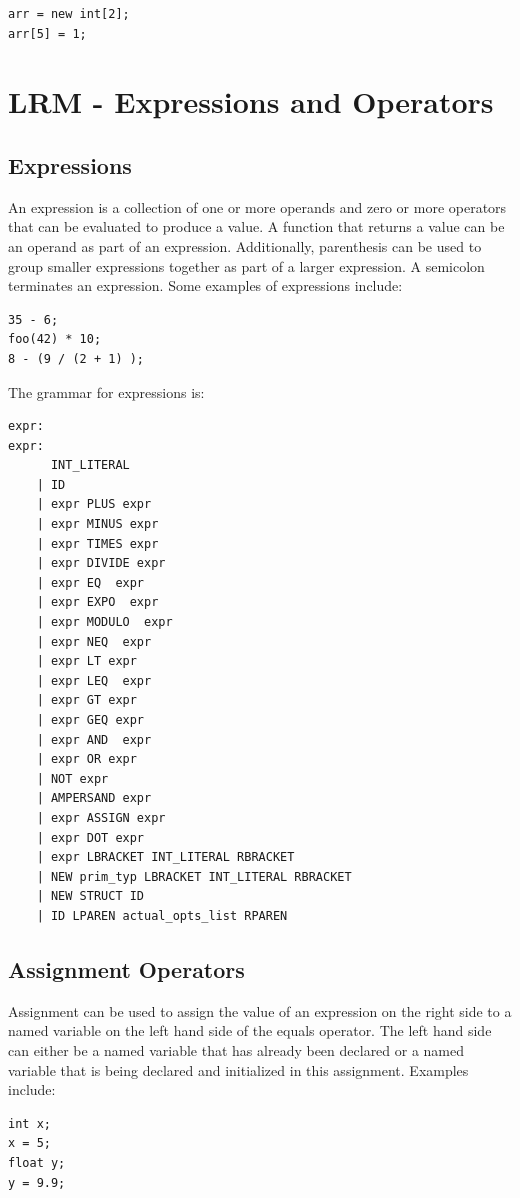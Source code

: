\documentclass{article}
\begin{document}
 \begin{lstlisting}
arr = new int[2];
arr[5] = 1;
\end{lstlisting}

\section{LRM - Expressions and Operators}

\subsection{Expressions}
An expression is a collection of one or more operands and zero or more operators that can be evaluated to produce a value.  A function that returns a value can be an operand as part of an expression.  Additionally, parenthesis can be used to group smaller expressions together as part of a larger expression.  A semicolon terminates an expression.  Some examples of expressions include:
\begin{lstlisting}
35 - 6;
foo(42) * 10;
8 - (9 / (2 + 1) );
\end{lstlisting}

The grammar for expressions is: 
\begin{Verbatim}[frame=single]
expr:
expr:
	  INT_LITERAL 	
	| ID 		
	| expr PLUS expr
	| expr MINUS expr
	| expr TIMES expr 
	| expr DIVIDE expr 	
	| expr EQ  expr 
	| expr EXPO  expr 
	| expr MODULO  expr 	
	| expr NEQ  expr 	
	| expr LT expr 		
	| expr LEQ  expr 
	| expr GT expr 		
	| expr GEQ expr 	
	| expr AND  expr 	
	| expr OR expr 		
	| NOT expr		
	| AMPERSAND expr	
	| expr ASSIGN expr
	| expr DOT expr 	
	| expr LBRACKET INT_LITERAL RBRACKET 	   
	| NEW prim_typ LBRACKET INT_LITERAL RBRACKET
	| NEW STRUCT ID 			
	| ID LPAREN actual_opts_list RPAREN          
\end{Verbatim}



\subsection{Assignment Operators}
Assignment can be used to assign the value of an expression on the right side to a named variable on the left hand side of the equals operator.  The left hand side can either be a named variable that has already been declared or a named variable that is being declared and initialized in this assignment.  Examples include:
\begin{lstlisting}
int x;
x = 5;
float y;
y = 9.9;
\end{lstlisting}
\end{document}
